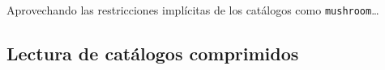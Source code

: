 Aprovechando las restricciones implícitas de los catálogos como \texttt{mushroom}\ldots







\subsection{Lectura de catálogos comprimidos}
\label{sec:clasificacion:catalogo-comprimido:lectura}

